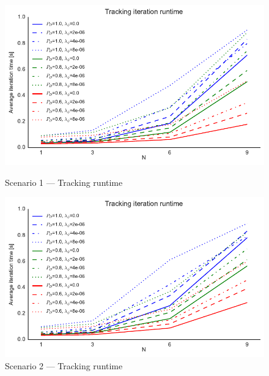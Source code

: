\begin{figure}
\centering
\includegraphics{Figures/plots/Scenario1_Tracking-Runtime.pdf}
\caption{Scenario 1 --- Tracking runtime}\label{fig:scenario1_tracking_runtime}

\includegraphics{Figures/plots/Scenario2_Tracking-Runtime.pdf}
\caption{Scenario 2 --- Tracking runtime}\label{fig:scenario2_tracking_runtime}
\end{figure}

